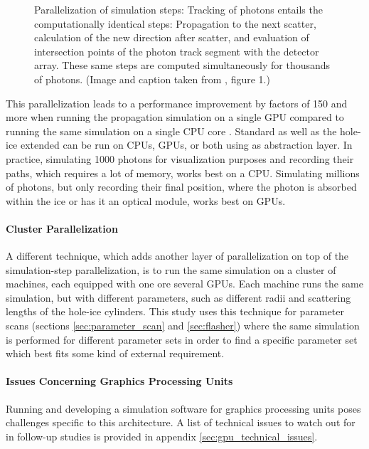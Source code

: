 \begin{figure}[htbp]
  \caption{Parallelization of simulation steps: Tracking of photons entails the computationally identical steps: Propagation to the next scatter, calculation of the new direction after scatter, and evaluation of intersection points of the photon track segment with the detector array. These same steps are computed simultaneously for thousands of photons. (Image and caption taken from \cite{ppcpaper}, figure 1.)}
  \label{fig:Id3ioyie}
\end{figure}

This parallelization leads to a performance improvement by factors of 150 and more when running the propagation simulation on a single GPU compared to running the same simulation on a single CPU core \cite{ppcpaper}.
Standard \clsim as well as the hole-ice extended \clsim can be run on CPUs, GPUs, or both using  as abstraction layer.
In practice, simulating 1000 photons for visualization purposes and recording their paths, which requires a lot of memory, works best on a CPU. Simulating millions of photons, but only recording their final position, where the photon is absorbed within the ice or has it an optical module, works best on GPUs.


\paragraph{Cluster Parallelization}
\label{sec:cluster_parallelization}
A different technique, which adds another layer of parallelization on top of the simulation-step parallelization, is to run the same simulation on a cluster of machines, each equipped with one ore several GPUs. Each machine runs the same simulation, but with different parameters, such as different radii and scattering lengths of the hole-ice cylinders.
This study uses this technique for parameter scans (sections \ref{sec:parameter_scan} and \ref{sec:flasher}) where the same simulation is performed for different parameter sets in order to find a specific parameter set which best fits some kind of external requirement.


\paragraph{Issues Concerning Graphics Processing Units}
Running and developing a simulation software for graphics processing units poses challenges specific to this architecture. A list of technical issues to watch out for in follow-up studies is provided in appendix \ref{sec:gpu_technical_issues}.


